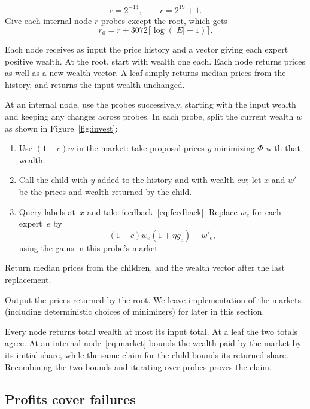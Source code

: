 \begin{equation}\label{eq:probepars}
      c=2^{-14},\qquad r=2^{19}+1 .
\end{equation}
Give each internal node \(r\) probes except the root, which gets
\[
       r_0=r+3072\lceil\log(|E|+1)\rceil .
\]

Each node receives as input the price history and
a vector giving each expert positive wealth.
At the root, start with wealth one each.
Each node returns prices as well as a new wealth vector.
A leaf simply returns median prices from the history,
and returns the input wealth unchanged.

At an internal node, use the probes successively, starting with
the input wealth and keeping any changes across probes.
In each probe, split the current wealth \(w\) as shown in
Figure~\ref{fig:invest}:
\begin{enumerate}
 \item Use \((1-c)w\) in the market:
  take proposal prices \(y\) minimizing \(\Phi\) with that wealth.
  \item Call the child with \(y\) added to the history
  and with wealth \(c w\);
  let \(x\) and \(w'\) be the prices and wealth returned by the child.
  \item Query labels at~\(x\) and take feedback~\eqref{eq:feedback}.
  Replace \(w_e\) for each expert~\(e\) by
  \begin{equation}\label{eq:invest}
       (1-c)w_e(1+\eta g_e) + w'_e ,
  \end{equation}
  using the gains in this probe's market.
 \end{enumerate}
Return median prices from the children,
and the wealth vector after the last replacement.

Output the prices returned by the root.
We leave implementation of the markets (including deterministic
choices of minimizers) for later in this section.



Every node returns total wealth at most its input total. At a leaf the
two totals agree. At an internal node~\eqref{eq:market} bounds the
wealth paid by the market by its initial share, while the same claim
for the child bounds its returned share. Recombining the two bounds
and iterating over probes proves the claim.

\subsection{Profits cover failures}

